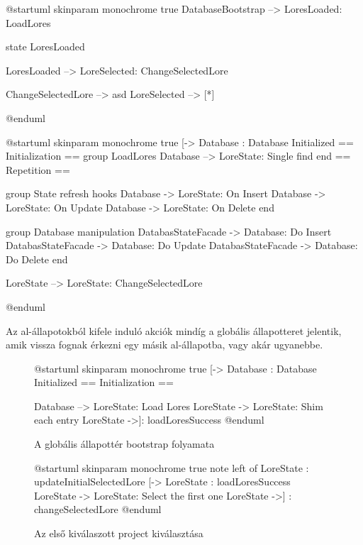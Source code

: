 \begin{plantuml}
	@startuml
	skinparam monochrome true
	DatabaseBootstrap --> LoresLoaded: LoadLores

	state LoresLoaded {
	}

	LoresLoaded --> LoreSelected: ChangeSelectedLore

	ChangeSelectedLore --> asd
	LoreSelected --> [*]


	@enduml
\end{plantuml}


\begin{plantuml}
	@startuml
	skinparam monochrome true
	[-> Database : Database Initialized
	== Initialization ==
	group LoadLores
		Database --> LoreState: Single find
	end
	== Repetition ==

	group State refresh hooks
		Database -> LoreState: On Insert
		Database -> LoreState: On Update
		Database -> LoreState: On Delete
	end

	group Database manipulation
		DatabasStateFacade -> Database: Do Insert
		DatabasStateFacade -> Database: Do Update
		DatabasStateFacade -> Database: Do Delete
	end

	LoreState --> LoreState: ChangeSelectedLore

	@enduml
\end{plantuml}

Az al-állapotokból kifele induló akciók mindíg a globális állapotteret jelentik, amik vissza fognak érkezni egy másik al-állapotba, vagy akár ugyanebbe.



\begin{figure}[h!]
	\centering
	\begin{plantuml}
		@startuml
		skinparam monochrome true
		[-> Database : Database Initialized
		== Initialization ==

		Database --> LoreState: Load Lores
		LoreState -> LoreState: Shim each entry
		LoreState ->]: loadLoresSuccess
		@enduml
	\end{plantuml}
	\caption{A globális állapottér bootstrap folyamata}
	\label{fig:global-state-bootstrap}
\end{figure}

\begin{figure}[h!]
	\centering
	\begin{plantuml}
		@startuml
		skinparam monochrome true
		note left of LoreState : updateInitialSelectedLore
		[-> LoreState : loadLoresSuccess
		LoreState -> LoreState: Select the first one
		LoreState ->] : changeSelectedLore
		@enduml
	\end{plantuml}
	\caption{Az első kiválaszott project kiválasztása}
	\label{fig:global-state-bootstrap}
\end{figure}

